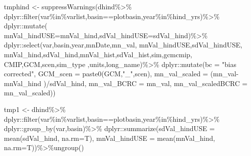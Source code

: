 \documentclass[
]{article}
\newenvironment{Shaded}{\begin{snugshade}}{\end{snugshade}}
\newcommand{\AttributeTok}[1]{\textcolor[rgb]{0.77,0.63,0.00}{#1}}
\newcommand{\FunctionTok}[1]{\textcolor[rgb]{0.00,0.00,0.00}{#1}}
\newcommand{\NormalTok}[1]{#1}
\newcommand{\OtherTok}[1]{\textcolor[rgb]{0.56,0.35,0.01}{#1}}
\newcommand{\SpecialCharTok}[1]{\textcolor[rgb]{0.00,0.00,0.00}{#1}}
\newcommand{\StringTok}[1]{\textcolor[rgb]{0.31,0.60,0.02}{#1}}
\begin{document}
\begin{Shaded}
\begin{Highlighting}[]
\NormalTok{        tmphind    }\OtherTok{\textless{}{-}} \FunctionTok{suppressWarnings}\NormalTok{(dhind}\SpecialCharTok{\%\textgreater{}\%}
\NormalTok{         dplyr}\SpecialCharTok{::}\FunctionTok{filter}\NormalTok{(var}\SpecialCharTok{\%in\%}\NormalTok{varlist,basin}\SpecialCharTok{==}\NormalTok{plotbasin,year}\SpecialCharTok{\%in\%}\NormalTok{hind\_yrs)}\SpecialCharTok{\%\textgreater{}\%}
\NormalTok{           dplyr}\SpecialCharTok{::}\FunctionTok{mutate}\NormalTok{(  }\AttributeTok{mnVal\_hindUSE=}\NormalTok{mnVal\_hind,}\AttributeTok{sdVal\_hindUSE=}\NormalTok{sdVal\_hind)}\SpecialCharTok{\%\textgreater{}\%}
\NormalTok{         dplyr}\SpecialCharTok{::}\FunctionTok{select}\NormalTok{(var,basin,year,mnDate,mn\_val,}
\NormalTok{                        mnVal\_hindUSE,sdVal\_hindUSE,}
\NormalTok{                       mnVal\_hind,sdVal\_hind,mnVal\_hist,sdVal\_hist,sim,gcmcmip,}
\NormalTok{                       CMIP,GCM,scen,sim\_type ,units,long\_name)}\SpecialCharTok{\%\textgreater{}\%}
\NormalTok{         dplyr}\SpecialCharTok{::}\FunctionTok{mutate}\NormalTok{(}\AttributeTok{bc =} \StringTok{"bias corrected"}\NormalTok{,}
                       \AttributeTok{GCM\_scen =} \FunctionTok{paste0}\NormalTok{(GCM,}\StringTok{"\_"}\NormalTok{,scen),}
                       \AttributeTok{mn\_val\_scaled =}\NormalTok{  (mn\_val}\SpecialCharTok{{-}}\NormalTok{mnVal\_hind )}\SpecialCharTok{/}\NormalTok{sdVal\_hind,}
                       \AttributeTok{mn\_val\_BCRC =}\NormalTok{ mn\_val,}
                       \AttributeTok{mn\_val\_scaledBCRC =}\NormalTok{ mn\_val\_scaled))}
       
\NormalTok{       tmp1 }\OtherTok{\textless{}{-}}\NormalTok{ dhind}\SpecialCharTok{\%\textgreater{}\%}
\NormalTok{         dplyr}\SpecialCharTok{::}\FunctionTok{filter}\NormalTok{(var}\SpecialCharTok{\%in\%}\NormalTok{varlist,basin}\SpecialCharTok{==}\NormalTok{plotbasin,year}\SpecialCharTok{\%in\%}\NormalTok{hind\_yrs)}\SpecialCharTok{\%\textgreater{}\%}
\NormalTok{         dplyr}\SpecialCharTok{::}\FunctionTok{group\_by}\NormalTok{(var,basin)}\SpecialCharTok{\%\textgreater{}\%}
\NormalTok{         dplyr}\SpecialCharTok{::}\FunctionTok{summarize}\NormalTok{(}\AttributeTok{sdVal\_hindUSE =} \FunctionTok{mean}\NormalTok{(sdVal\_hind, }\AttributeTok{na.rm=}\NormalTok{T),}
                          \AttributeTok{mnVal\_hindUSE =} \FunctionTok{mean}\NormalTok{(mnVal\_hind, }\AttributeTok{na.rm=}\NormalTok{T))}\SpecialCharTok{\%\textgreater{}\%}\FunctionTok{ungroup}\NormalTok{()}


\end{Highlighting}
\end{Shaded}
\end{document}
